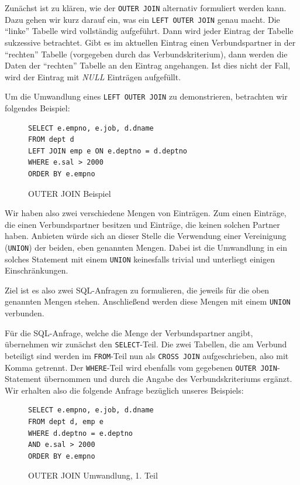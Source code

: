 Zunächst ist zu klären, wie der \verb|OUTER JOIN| alternativ formuliert werden kann. Dazu gehen wir kurz darauf ein, was ein \verb|LEFT OUTER JOIN| genau macht. Die ``linke'' Tabelle wird vollständig aufgeführt. Dann wird jeder Eintrag der Tabelle sukzessive betrachtet. Gibt es im aktuellen Eintrag einen Verbundspartner in der ``rechten'' Tabelle (vorgegeben durch das Verbundskriterium), dann werden die Daten der ``rechten'' Tabelle an den Eintrag angehangen. Ist dies nicht der Fall, wird der Eintrag mit \textit{NULL} Einträgen aufgefüllt. 

Um die Umwandlung eines \verb|LEFT OUTER JOIN| zu demonstrieren, betrachten wir folgendes Beispiel:

\begin{figure}[h]
\begin{verbatim}
SELECT e.empno, e.job, d.dname 
FROM dept d 
LEFT JOIN emp e ON e.deptno = d.deptno 
WHERE e.sal > 2000
ORDER BY e.empno
\end{verbatim}
\caption{OUTER JOIN Beispiel}
\end{figure}

Wir haben also zwei verschiedene Mengen von Einträgen. Zum einen Einträge, die einen Verbundspartner besitzen und Einträge, die keinen solchen Partner haben. Anbieten würde sich an dieser Stelle die Verwendung einer Vereinigung (\verb|UNION|) der beiden, eben genannten Mengen. Dabei ist die Umwandlung in ein solches Statement mit einem \verb|UNION| keinesfalls trivial und unterliegt einigen Einschränkungen. 

Ziel ist es also zwei SQL-Anfragen zu formulieren, die jeweils für die oben genannten Mengen stehen. Anschließend werden diese Mengen mit einem \verb|UNION| verbunden.

Für die SQL-Anfrage, welche die Menge der Verbundspartner angibt, übernehmen wir zunächst den \verb|SELECT|-Teil. Die zwei Tabellen, die am Verbund beteiligt sind werden im \verb|FROM|-Teil nun als \verb|CROSS JOIN| aufgeschrieben, also mit Komma getrennt. Der \verb|WHERE|-Teil wird ebenfalls vom gegebenen \verb|OUTER JOIN|-Statement übernommen und durch die Angabe des Verbundskriteriums ergänzt.
Wir erhalten also die folgende Anfrage bezüglich unseres Beispiels:

\begin{figure}[h]
\begin{verbatim}
SELECT e.empno, e.job, d.dname 
FROM dept d, emp e
WHERE d.deptno = e.deptno
AND e.sal > 2000
ORDER BY e.empno
\end{verbatim}
\caption{OUTER JOIN Umwandlung, 1. Teil}
\end{figure}

